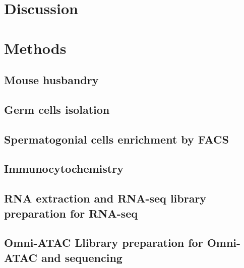 \documentclass[12pt,twoside]{reedthesis}
\begin{document}
\newpage

\hypertarget{discussion}{%
\section{Discussion}\label{discussion}}

\newpage

\hypertarget{methods-1}{%
\section{Methods}\label{methods-1}}

\hypertarget{mouse-husbandry}{%
\subsection{Mouse husbandry}\label{mouse-husbandry}}

\hypertarget{germ-cells-isolation}{%
\subsection{Germ cells isolation}\label{germ-cells-isolation}}

\hypertarget{spermatogonial-cells-enrichment-by-facs}{%
\subsection{Spermatogonial cells enrichment by FACS}\label{spermatogonial-cells-enrichment-by-facs}}

\hypertarget{immunocytochemistry-1}{%
\subsection{Immunocytochemistry}\label{immunocytochemistry-1}}

\hypertarget{rna-extraction-and-rna-seq-library-preparation-for-rna-seq}{%
\subsection{RNA extraction and RNA-seq library preparation for RNA-seq}\label{rna-extraction-and-rna-seq-library-preparation-for-rna-seq}}

\hypertarget{omni-atac-llibrary-preparation-for-omni-atac-and-sequencing}{%
\subsection{Omni-ATAC Llibrary preparation for Omni-ATAC and sequencing}\label{omni-atac-llibrary-preparation-for-omni-atac-and-sequencing}}
\end{document}
